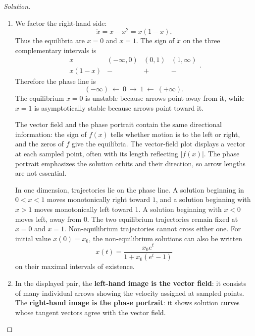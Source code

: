 \documentclass[12pt]{amsart}
\theoremstyle{conjecture}
\theoremstyle{definition}
\theoremstyle{question}
\theoremstyle{theorem}
\newenvironment{solution}
{\begin{proof}[Solution]}
{\end{proof}}
\begin{document}
    \begin{solution}
        \begin{enumerate}
            \item[(a)] We factor the right-hand side:
            \[
                \dot x=x-x^2=x(1-x).
            \]
            Thus the equilibria are $x=0$ and $x=1$. The sign of $\dot x$ on the
            three complementary intervals is
            \[
                \begin{array}{c|ccc}
                    x&(-\infty,0)&(0,1)&(1,\infty)\\ \hline
                    x(1-x)&-&+&-
                \end{array}.
            \]
            Therefore the phase line is
            \[
                \textstyle
                (-\infty)\ \longleftarrow\ \boxed{0}\ \longrightarrow\
                \boxed{1}\ \longleftarrow\ (+\infty).
            \]
            The equilibrium $x=0$ is unstable because arrows point away from it,
            while $x=1$ is asymptotically stable because arrows point toward it.

            The vector field and the phase portrait contain the same directional
            information: the sign of $f(x)$ tells whether motion is to the left or
            right, and the zeros of $f$ give the equilibria. The vector-field plot
            displays a vector at each sampled point, often with its length reflecting
            $|f(x)|$. The phase portrait emphasizes the solution orbits and their
            direction, so arrow lengths are not essential.

            In one dimension, trajectories lie on the phase line. A solution beginning
            in $0<x<1$ moves monotonically right toward $1$, and a solution beginning
            with $x>1$ moves monotonically left toward $1$. A solution beginning with
            $x<0$ moves left, away from $0$. The two equilibrium trajectories remain
            fixed at $x=0$ and $x=1$. Non-equilibrium trajectories cannot cross either
            one. For initial value $x(0)=x_0$, the non-equilibrium solutions can also be
            written
            \[
                x(t)=\frac{x_0e^t}{1+x_0(e^t-1)}
            \]
            on their maximal intervals of existence.

            \item[(b)] In the displayed pair, the \textbf{left-hand image is the
            vector field}: it consists of many individual arrows showing the velocity
            assigned at sampled points. The \textbf{right-hand image is the phase
            portrait}: it shows solution curves whose tangent vectors agree with the
            vector field.


\end{enumerate}
\end{solution}
\end{document}
